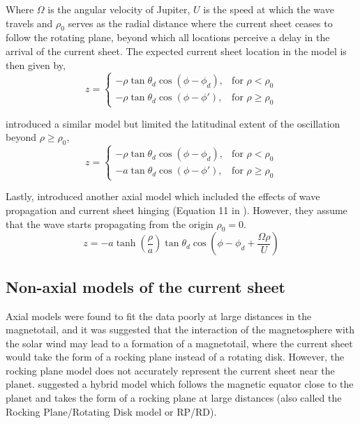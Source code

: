 Where $\Omega$ is the angular velocity of Jupiter, $U$ is the speed at which the wave travels and $\rho_0$ serves as the radial distance where the current sheet ceases to follow the rotating plane, beyond which all locations perceive a delay in the arrival of the current sheet. The expected current sheet location in the  model is then given by,
\begin{equation}
    z = \begin{cases}
    -\rho \tan\theta_d \cos\left(\phi - \phi_d\right), & \text{for } \rho < \rho_0\\
    -\rho \tan\theta_d \cos\left(\phi - \phi'\right),  & \text{for } \rho \geq \rho_0
    \end{cases}
    \label{eqn:kivelson1978}
\end{equation}

 introduced a similar model but limited the latitudinal extent of the oscillation beyond $\rho \geq \rho_0$,
\begin{equation}
    z = \begin{cases}
    -\rho \tan\theta_d \cos\left(\phi - \phi_d\right), & \text{for } \rho < \rho_0\\
    -a \tan\theta_d \cos\left(\phi - \phi'\right),  & \text{for } \rho \geq \rho_0
    \end{cases}
\end{equation}

Lastly,  introduced another axial model which included the effects of wave propagation and current sheet hinging (Equation 11 in ). However, they assume that the wave starts propagating from the origin $\rho_0=0$.
\begin{equation}
    z = -a \tanh\left(\frac{\rho}{a}\right) \tan\theta_d \cos\left(\phi - \phi_d + \frac{\Omega \rho}{U}\right)
    \label{eqn:behannon1981}
\end{equation}

\subsection{Non-axial models of the current sheet}
Axial models were found to fit the data poorly at large distances in the magnetotail, and it was suggested that the interaction of the magnetosphere with the solar wind may lead to a formation of a magnetotail, where the current sheet would take the form of a rocking plane instead of a rotating disk. However, the rocking plane model does not accurately represent the current sheet near the planet.  suggested a hybrid model which follows the magnetic equator close to the planet and takes the form of a rocking plane at large distances (also called the Rocking Plane/Rotating Disk model or RP/RD).


